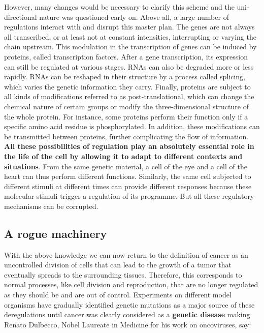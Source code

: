 \documentclass[a4paper,12pt,twoside,onecolumn,openright,final,oldfontcommands]{memoir}
\begin{document}
However, many changes would be necessary to clarify this scheme and the
uni-directional nature was questioned early on. Above all, a large
number of regulations interact with and disrupt this master plan. The
genes are not always all transcribed, or at least not at constant
intensities, interrupting or varying the chain upstream. This modulation
in the transcription of genes can be induced by proteins, called
transcription factors. After a gene transcription, its expression can
still be regulated at various stages. RNAs can also be degraded more or
less rapidly. RNAs can be reshaped in their structure by a process
called splicing, which varies the genetic information they carry.
Finally, proteins are subject to all kinds of modifications referred to
as post-translational, which can change the chemical nature of certain
groups or modify the three-dimensional structure of the whole protein.
For instance, some proteins perform their function only if a specific
amino acid residue is phosphorylated. In addition, these modifications
can be transmitted between proteins, further complicating the flow of
information. \textbf{All these possibilities of regulation play an
absolutely essential role in the life of the cell by allowing it to
adapt to different contexts and situations}. From the same genetic
material, a cell of the eye and a cell of the heart can thus perform
different functions. Similarly, the same cell subjected to different
stimuli at different times can provide different responses because these
molecular stimuli trigger a regulation of its programme. But all these
regulatory mechanisms can be corrupted.

\subsection{A rogue machinery}\label{a-rogue-machinery}

With the above knowledge we can now return to the definition of cancer
as an uncontrolled division of cells that can lead to the growth of a
tumor that eventually spreads to the surrounding tissues. Therefore,
this corresponds to normal processes, like cell division and
reproduction, that are no longer regulated as they should be and are out
of control. Experiments on different model organisms have gradually
identified genetic mutations as a major source of these deregulations
\citep[\citet{reddy1982point}]{nowell1976clonal} until cancer was
clearly considered as a \textbf{genetic disease} making Renato Dulbecco,
Nobel Laureate in Medicine for his work on oncoviruses, say:
\end{document}
